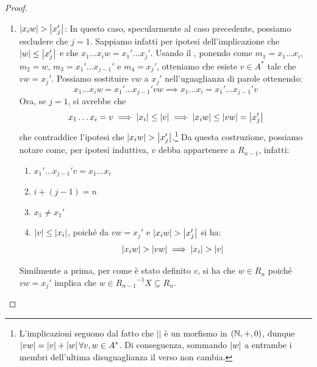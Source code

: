 \begin{proof}
\begin{description}
\begin{enumerate}
          Ciò ci permette di porre \(r_{n-1} = x_{i}w\). Dall'ipotesi induttiva, sappiamo che \(r_{n-1} \in R_{n-1}\), poiché:
          \begin{enumerate}
            \item \(x_1\ldots x_{i-1}r_{n-1} = x_1'\ldots x_j'\), sostituendo \(r_{n-1}\) a \(x_{i}w\)
            \item \(i-1+j=n\)
            \item \(x_1 \neq x_1'\)
            \item \(\abs{r_{n-1}} = \abs{x_i w} \leq \abs{x_j'}\)
          \end{enumerate}
          Ma per com'è stato definito \(r_{n-1}\), si ha che \(w \in R_n\) poiché \(x_{i} w = r_{n-1}\) implica che \(w \in X^{-1} R_{n-1} \subseteq R_n\).
        \item \(\left|x_{i}w\right| > \left|x_j'\right|\):
          In questo caso, specularmente al caso precedente, possiamo escludere che \(j=1\).
          Sappiamo infatti per ipotesi dell'implicazione che \(\left|w\right| \leq \left|x_j'\right|\) e che \(x_1\ldots x_i w = x_1'\ldots x_j'\). Usando il , ponendo come \(m_1 = x_1\ldots x_i\), \(m_2 = w\), \(m_3 = x_1'\ldots x_{j-1}'\) e \(m_4 = x_j'\), otteniamo che esiste \(v \in A^*\) tale che \(vw=x_j'\).
          Possiamo sostituire \(vw\) a \(x_j'\) nell'uguaglianza di parole ottenendo:
          \[x_1\ldots x_i w = x_1'\ldots x_{j-1}' vw \implies x_1\ldots x_i = x_1'\ldots x_{j-1}' v \]
          Ora, se \(j=1\), si avrebbe che 
            \[x_1\ldots x_i = v \implies \left|x_i\right| \leq \left|v\right| \implies \left|x_i w\right| \leq \left|vw\right| = \left|x_j'\right| \]
          che contraddice l'ipotesi che \(\left|x_{i}w\right| > \left|x_j'\right|\).\footnote{L'implicazioni seguono dal fatto che \(||\) è un morfismo in \((\mathbb{N},+,0)\), dunque \(\left|vw\right| = \left|v\right|+\left|w\right| \forall v,w \in A^*\). Di conseguenza, sommando \(\left|w\right|\) a entrambe i membri dell'ultima disuguaglianza il verso non cambia.}
          Da questa costruzione, possiamo notare come, per ipotesi induttiva, \(v\) debba appartenere a \(R_{n-1}\), infatti:
          \begin{enumerate}
            \item \(x_1'\ldots x_{j-1}' v = x_1\ldots x_i\)
            \item \(i + (j-1) = n\)
            \item \(x_1 \neq x_1'\)
            \item \(\left|v\right| \leq \left|x_i\right|\), poiché da \(vw = x_j'\) e \(\left|x_{i}w\right| > \left|x_j'\right|\) si ha:
            \[\left|x_{i}w\right|  > \left|vw\right| \implies \left|x_{i}\right| > \left|v\right|\]
        \end{enumerate}
        Similmente a prima, per come è stato definito \(v\), si ha che \(w \in R_n\) poiché \(vw = x_j'\) implica che \(w \in {R_{n-1}}^{-1} X \subseteq R_n\).
      \end{enumerate}
  \end{description}
\end{proof}

